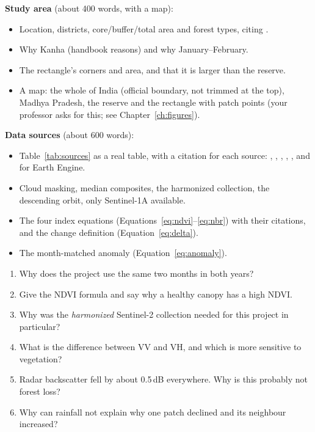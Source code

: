 \begin{foryourreport}
\textbf{Study area} (about 400 words, with a map):
\begin{itemize}
  \item Location, districts, core/buffer/total area and forest types, citing \citet{kanha2026}.
  \item Why Kanha (handbook reasons) and why January--February.
  \item The rectangle's corners and area, and that it is larger than the reserve.
  \item A map: the whole of India (official boundary, not trimmed at the top), Madhya Pradesh, the reserve and the rectangle with patch points (your professor asks for this; see Chapter~\ref{ch:figures}).
\end{itemize}
\textbf{Data sources} (about 600 words):
\begin{itemize}
  \item Table~\ref{tab:sources} as a real table, with a citation for each source: \citet{drusch2012}, \citet{torres2012}, \citet{funk2015}, \citet{munozsabater2021}, \citet{nasadem2020}, and \citet{gorelick2017} for Earth Engine.
  \item Cloud masking, median composites, the harmonized collection, the descending orbit, only Sentinel-1A available.
  \item The four index equations (Equations~\ref{eq:ndvi}--\ref{eq:nbr}) with their citations, and the change definition (Equation~\ref{eq:delta}).
  \item The month-matched anomaly (Equation~\ref{eq:anomaly}).
\end{itemize}
\end{foryourreport}

\begin{selfcheck}
\begin{enumerate}
  \item Why does the project use the same two months in both years?
  \item Give the NDVI formula and say why a healthy canopy has a high NDVI.
  \item Why was the \emph{harmonized} Sentinel-2 collection needed for this project in particular?
  \item What is the difference between VV and VH, and which is more sensitive to vegetation?
  \item Radar backscatter fell by about 0.5\,dB everywhere. Why is this probably not forest loss?
  \item Why can rainfall not explain why one patch declined and its neighbour increased?
\end{enumerate}
\end{selfcheck}
